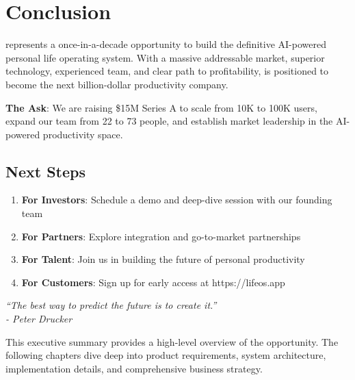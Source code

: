 \section{Conclusion}

\lifeos{} represents a once-in-a-decade opportunity to build the definitive AI-powered personal life operating system. With a massive addressable market, superior technology, experienced team, and clear path to profitability, \lifeos{} is positioned to become the next billion-dollar productivity company.

\begin{keypoint}
\textbf{The Ask}: We are raising \$15M Series A to scale from 10K to 100K users, expand our team from 22 to 73 people, and establish market leadership in the AI-powered productivity space.
\end{keypoint}

\subsection{Next Steps}

\begin{enumerate}
    \item \textbf{For Investors}: Schedule a demo and deep-dive session with our founding team
    \item \textbf{For Partners}: Explore integration and go-to-market partnerships
    \item \textbf{For Talent}: Join us in building the future of personal productivity
    \item \textbf{For Customers}: Sign up for early access at https://lifeos.app
\end{enumerate}

\vspace{1cm}

\begin{center}
\textit{``The best way to predict the future is to create it.''}\\
\textit{- Peter Drucker}
\end{center}

\vspace{1cm}

\noindent This executive summary provides a high-level overview of the \lifeos{} opportunity. The following chapters dive deep into product requirements, system architecture, implementation details, and comprehensive business strategy.

